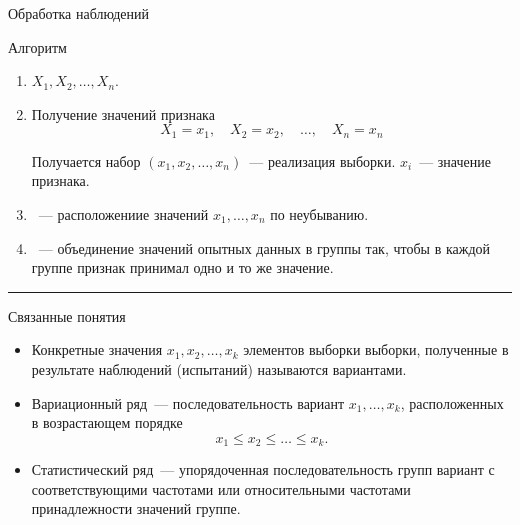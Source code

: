 \documentclass[unicode,11pt,notheorems,xcolor=table]{beamer}
\begin{document}
\begin{frame}{Обработка наблюдений}{}
    \begin{block}{Алгоритм}
        \begin{enumerate}
            \item {} $X_1,X_2,\ldots, X_n$.
        \item {} Получение значений признака
        $$
            X_1=x_1,\quad X_2=x_2,\quad\ldots,\quad X_n=x_n
        $$
    
        Получается набор $(x_1,x_2,\ldots,x_n)$~--- \alert{реализация выборки}.
        $x_i$~--- значение признака.
    
        \item  {}~--- расположениие значений $x_1,\ldots,x_n$ по неубыванию.
    
        \item {}~---  объединение значений опытных данных в группы так, чтобы в каждой группе признак принимал одно и то же значение.
    \end{enumerate}
\end{block}
     
    \par\medskip\hrule\par \medskip


\end{frame}


\begin{frame}{Связанные понятия}{}
    \begin{itemize}
        \item Конкретные значения $x_1,x_2,\ldots, x_k$ элементов выборки выборки, полученные в результате наблюдений (испытаний) называются \alert{вариантами}.
        
        \item \alert{Вариационный ряд}~--- последовательность вариант $x_1,\ldots, x_k$, расположенных в возрастающем порядке
        $$
            x_1 \leqslant x_2 \leqslant \ldots \leqslant x_k.
        $$
        \item \alert{Статистический ряд}~--- упорядоченная последовательность групп вариант с соответствующими частотами или относительными частотами принадлежности значений группе.
    \end{itemize}
\end{frame}
\end{document}

